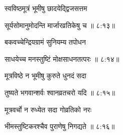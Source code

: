 
{\devanagarifont स्वविष्ठमूत्रं भूमीषु छादयेद्द्विजसत्तम  \danda\dontdisplaylinenum }%


{\devanagarifont सूर्यसोमानुमोदन्ति मार्जारव्रतिकेषु च {॥ ८:१३॥} \veg\dontdisplaylinenum }%



{\devanagarifont बकवच्चेन्द्रियग्रामं सुनियम्य तपोधन \thinspace{\dandab} \dontdisplaylinenum }%


{\devanagarifont साधयेच्च मनस्तुष्टिं मोक्षसाधनतत्परः {॥ ८:१४॥} \veg\dontdisplaylinenum }%



{\devanagarifont मूत्रविष्ठे न भूमीषु कुरुते धुनदं सदा \thinspace{\dandab} \dontdisplaylinenum }%


{\devanagarifont तुष्यते भगवान्शर्वः श्वानव्रतचरो यदि {॥ ८:१५॥} \veg\dontdisplaylinenum }%



{\devanagarifont मूत्रवर्चो न रुध्येत सदा गोव्रतिको नरः \thinspace{\dandab} \dontdisplaylinenum }%


{\devanagarifont भीमस्तुष्टिकरश्चैव पुराणेषु निगद्यते {॥ ८:१६॥} \veg\dontdisplaylinenum }%



